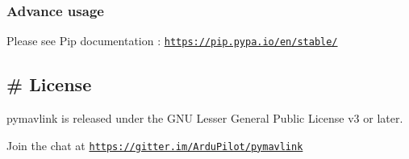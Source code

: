 \subsubsection*{Advance usage}

Please see Pip documentation \+: \href{https://pip.pypa.io/en/stable/}{\tt https\+://pip.\+pypa.\+io/en/stable/}

\subsection*{\# License }

pymavlink is released under the G\+NU Lesser General Public License v3 or later.

Join the chat at \href{https://gitter.im/ArduPilot/pymavlink}{\tt https\+://gitter.\+im/\+Ardu\+Pilot/pymavlink} 